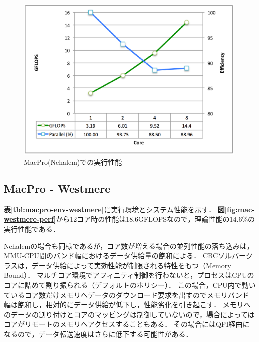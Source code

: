 \begin{figure}[htdp]
\begin{center}
\includegraphics[height=8cm,clip]{mac-nehalem.eps}
\end{center}
\caption{MacPro(Nehalem)での実行性能}
\label{fig:mac-nehalem-perf}
\end{figure}

\pagebreak
%
\subsection{MacPro - Westmere}

\textbf{表\ref{tbl:macpro-env-westmere}}に実行環境とシステム性能を示す．
\textbf{図\ref{fig:mac-westmere-perf}}から12コア時の性能は18.6GFLOPSなので，理論性能の14.6\%の実行性能である．

Nehalemの場合も同様であるが，コア数が増える場合の並列性能の落ち込みは，MMU-CPU間のバンド幅におけるデータ供給量の飽和による．
CBCソルバークラスは，データ供給によって実効性能が制限される特性をもつ（Memory Bound）．
マルチコア環境でアフィニティ制御を行わないと，プロセスはCPUのコアに詰めて割り振られる（デフォルトのポリシー）．
この場合，CPU内で動いているコア数だけメモリへデータのダウンロード要求を出すのでメモリバンド幅は飽和し，相対的にデータ供給が低下し，性能劣化を引き起こす．
メモリへのデータの割り付けとコアのマッピングは制御していないので，場合によってはコアがリモートのメモリへアクセスすることもある．
その場合にはQPI経由になるので，データ転送速度はさらに低下する可能性がある．

